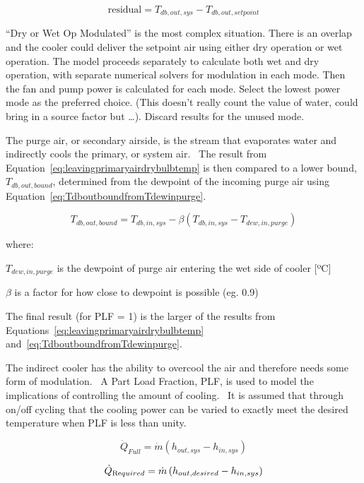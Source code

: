 \begin{equation}
\text{residual} = T_{db,out,sys} - T_{db,out,setpoint}
\end{equation}

``Dry or Wet Op Modulated'' is the most complex situation. There is an overlap and the cooler could deliver the setpoint air using either dry operation or wet operation. The model proceeds separately to calculate both wet and dry operation, with separate numerical solvers for modulation in each mode. Then the fan and pump power is calculated for each mode. Select the lowest power mode as the preferred choice. (This doesn't really count the value of water, could bring in a source factor but \ldots{}). Discard results for the unused mode.

The purge air, or secondary airside, is the stream that evaporates water and indirectly cools the primary, or system air.~ The result from Equation~\ref{eq:leavingprimaryairdrybulbtemp} is then compared to a lower bound, \({T_{db,out,bound}}\), determined from the dewpoint of the incoming purge air using Equation~\ref{eq:TdboutboundfromTdewinpurge}.

\begin{equation}
{T_{db,out,bound}} = {T_{db,in,sys}} - \beta ({T_{db,in,sys}} - {T_{dew,in,purge}})
\label{eq:TdboutboundfromTdewinpurge}
\end{equation}

where:

\({T_{dew,in,purge}}\) is the dewpoint of purge air entering the wet side of cooler {[}ºC{]}

\(\beta\) is a factor for how close to dewpoint is possible (eg. 0.9)

The final result (for PLF = 1) is the larger of the results from Equations~\ref{eq:leavingprimaryairdrybulbtemp} and~\ref{eq:TdboutboundfromTdewinpurge}.

The indirect cooler has the ability to overcool the air and therefore needs some form of modulation.~ A Part Load Fraction, PLF, is used to model the implications of controlling the amount of cooling.~ It is assumed that through on/off cycling that the cooling power can be varied to exactly meet the desired temperature when PLF is less than unity.

\begin{equation}
{\dot Q_{Full}} = \dot m\left( {{h_{out,sys}} - {h_{in,sys}}} \right)
\end{equation}

\begin{equation}
{\dot Q_{{\mathop{\rm Re}\nolimits} quired}} = \dot m\left( {{h_{out,desired}} - {h_{in,sys}}} \right)
\end{equation}

